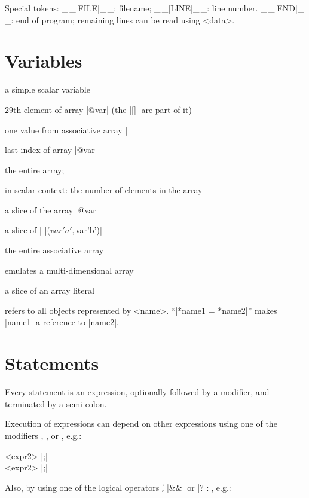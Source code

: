 \hangindent=1cm
Special tokens:
\newline \_\,\_|FILE|\_\,\_: filename; \_\,\_|LINE|\_\,\_: line number.
\newline \_\,\_|END|\_\,\_: end of program; remaining lines can be read using
\<<data>\>.
\section{Variables} 

\begin{enum}{3.2cm}

 a simple scalar variable

 29th element of array |@var| (the |[]| are
part of it)

 one value from associative array |%

 last index of array |@var|

 the entire array;

in scalar context: the number of elements in the array

 a slice of the array |@var|

 a slice of |%
|($var{'a'},$var{'b'})|

 the entire associative array

 emulates a multi-dimensional array

 a slice of an array literal

 refers to all objects represented by <name>.
``|*name1 = *name2|'' makes |name1| a reference to |name2|.

\end{enum}
\section{Statements} 

Every statement is an expression, optionally followed by a modifier,
and terminated by a semi-colon.

Execution of expressions can depend on other expressions using one of
the modifiers , ,  or ,
e.g.:

  <expr2> |;| \\
\quad	<expr1>  <expr2> |;|

Also, by using one of the logical operators \|\|, |&&| or |? :|, e.g.:

